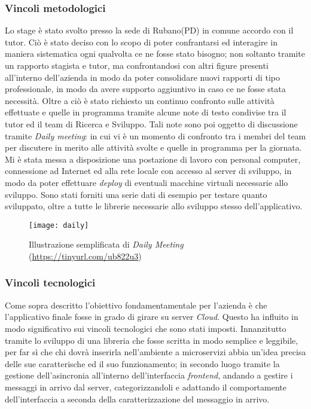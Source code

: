 \subsubsection{Vincoli metodologici}
Lo stage è stato svolto presso la sede di Rubano(PD) in comune accordo con il tutor. Ciò è stato deciso con lo scopo di poter confrantarsi ed interagire in maniera sistematica ogni qualvolta ce ne fosse stato bisogno; non soltanto tramite un rapporto stagista e tutor, ma confrontandosi con altri figure presenti all'interno dell'azienda in modo da poter consolidare nuovi rapporti di tipo professionale, in modo da avere supporto aggiuntivo in caso ce ne fosse stata necessità.
Oltre a ciò è stato richiesto un continuo confronto sulle attività effettuate e quelle in programma tramite alcune note di testo condivise tra il tutor ed il team di Ricerca e Sviluppo.
Tali note sono poi oggetto di discussione tramite \textit{Daily meeting}: in cui vi è un momento di confronto tra i membri del team per discutere in merito alle attività svolte e quelle in programma per la giornata. Mi è stata messa a disposizione una postazione di lavoro con personal computer, connessione ad Internet ed alla rete locale con accesso al server di sviluppo, in modo da poter effettuare \textit{deploy} di eventuali macchine virtuali necessarie allo sviluppo. Sono stati forniti una serie dati di esempio per testare quanto sviluppato, oltre a tutte le librerie necessarie allo sviluppo stesso dell’applicativo.
\begin{figure}[!h] 
	\centering 
	\texttt{[image: daily]} 
	\caption{Illustrazione semplificata di \textit{Daily Meeting} (\url{https://tinyurl.com/ub822u3})}
\end{figure}
\subsubsection{Vincoli tecnologici}
Come sopra descritto l'obiettivo fondamentamentale per l'azienda è che l'applicativo finale fosse in grado di girare su server \textit{Cloud}. Questo ha influito in modo significativo sui vincoli tecnologici che sono stati imposti. Innanzitutto tramite lo sviluppo di una libreria che fosse scritta in modo semplice e leggibile, per far sì che chi dovrà inserirla nell'ambiente a microservizi abbia un'idea precisa delle sue caratterische ed il suo funzionamento; in secondo luogo tramite la gestione dell'asincronia all'interno dell'interfaccia \textit{frontend}, andando a gestire i messaggi in arrivo dal server, categorizzandoli e adattando il comportamente dell'interfaccia a seconda della caratterizzazione del messaggio in arrivo.
